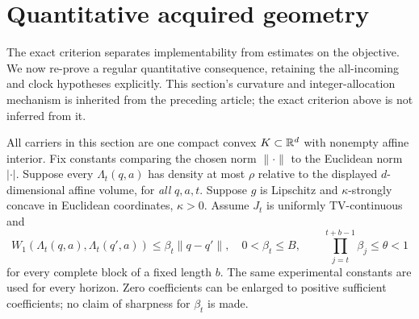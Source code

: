 \section{Quantitative acquired geometry}\label{sec:geometry}
The exact criterion separates implementability from estimates on the objective. We now re-prove a regular quantitative consequence, retaining the all-incoming and clock hypotheses explicitly. This section's curvature and integer-allocation mechanism is inherited from the preceding article\cite{prior}; the exact criterion above is not inferred from it.

All carriers in this section are one compact convex $K\subset\mathbb R^d$ with nonempty affine interior. Fix constants comparing the chosen norm $\|\cdot\|$ to the Euclidean norm $|\cdot|$. Suppose every $\Lambda_t(q,a)$ has density at most $\rho$ relative to the displayed $d$-dimensional affine volume, for \emph{all} $q,a,t$. Suppose $g$ is Lipschitz and $\kappa$-strongly concave in Euclidean coordinates, $\kappa>0$. Assume $J_t$ is uniformly TV-continuous and
\begin{equation}\label{eq:regular_stability}
 W_1(\Lambda_t(q,a),\Lambda_t(q',a))\le\beta_t\|q-q'\|,
 \quad 0<\beta_t\le B,\qquad
 \prod_{j=t}^{t+b-1}\beta_j\le\theta<1
\end{equation}
for every complete block of a fixed length $b$. The same experimental constants are used for every horizon. Zero coefficients can be enlarged to positive sufficient coefficients; no claim of sharpness for $\beta_t$ is made.

